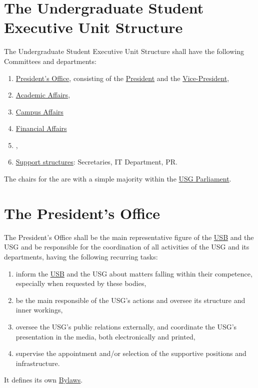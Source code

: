 \label{USGexecutiveUnitDef}

\section{The Undergraduate Student Executive Unit Structure} 
\label{USGstructure}
The Undergraduate Student Executive Unit Structure shall have the following Committees and departments:
\begin{enumerate}
\item \hyperref[PresidentOfficeDef]{President's Office}, consisting of the \hyperref[PresDef]{President} and the \hyperref[VPDef]{Vice-President},
\item \hyperref[AACdef]{Academic Affairs}\add[S]{,},
\item \hyperref[CACdef]{Campus Affairs}\add[S]{,}
\item \hyperref[Financesdef]{Financial Affairs}\add[S]{,}
\item \hyperref[IACdef]{},
\item \hyperref[suppstrucdef]{Support structures}: Secretaries, IT Department, PR.
\end{enumerate}
The chairs for the  are  with a simple majority within the \hyperref[USGParliamentDef]{USG Parliament}.


\section{The President's Office} 
\label{PresidentOfficeDef}
The President's Office shall be the main representative figure of the \hyperref[studentbody]{USB} and the USG and be responsible for the coordination of all activities of the USG and its departments, having the following recurring tasks:
\begin{enumerate}
\item {} inform the \hyperref[studentbody]{USB} and the USG about matters falling within their competence, especially when requested by these bodies,
\item be the main responsible of the USG's actions and oversee its structure and inner workings,
\item oversee the USG's public relations externally, and coordinate the USG's presentation in the media, both electronically and printed,
\item supervise the appointment and/or selection of the supportive positions and infrastructure.
\end{enumerate}
It defines its own \hyperref[PresByLawsDef]{Bylaws}.

